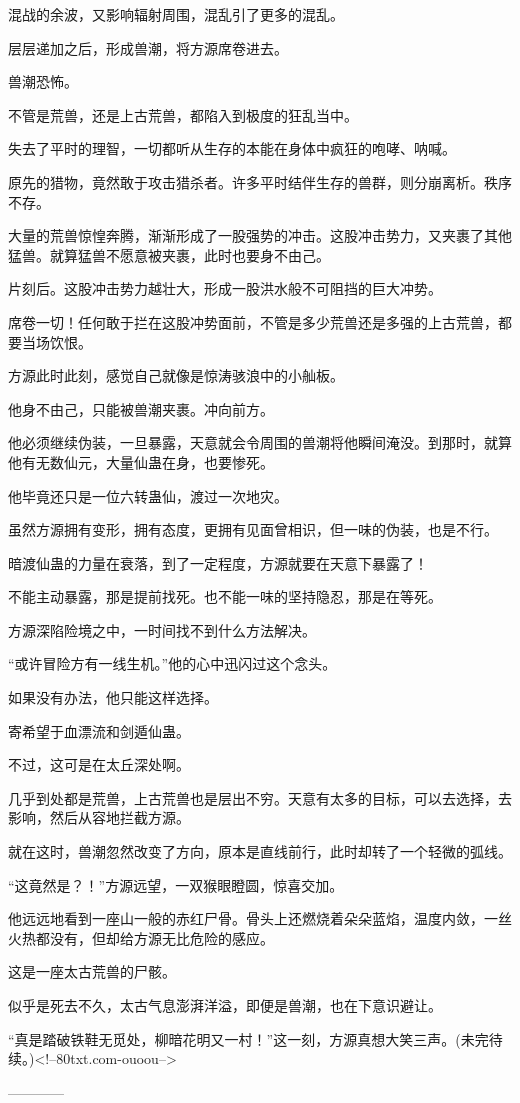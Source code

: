 \begin{this_body}
混战的余波，又影响辐射周围，混乱引了更多的混乱。

层层递加之后，形成兽潮，将方源席卷进去。

兽潮恐怖。

不管是荒兽，还是上古荒兽，都陷入到极度的狂乱当中。

失去了平时的理智，一切都听从生存的本能在身体中疯狂的咆哮、呐喊。

原先的猎物，竟然敢于攻击猎杀者。许多平时结伴生存的兽群，则分崩离析。秩序不存。

大量的荒兽惊惶奔腾，渐渐形成了一股强势的冲击。这股冲击势力，又夹裹了其他猛兽。就算猛兽不愿意被夹裹，此时也要身不由己。

片刻后。这股冲击势力越壮大，形成一股洪水般不可阻挡的巨大冲势。

席卷一切！任何敢于拦在这股冲势面前，不管是多少荒兽还是多强的上古荒兽，都要当场饮恨。

方源此时此刻，感觉自己就像是惊涛骇浪中的小舢板。

他身不由己，只能被兽潮夹裹。冲向前方。

他必须继续伪装，一旦暴露，天意就会令周围的兽潮将他瞬间淹没。到那时，就算他有无数仙元，大量仙蛊在身，也要惨死。

他毕竟还只是一位六转蛊仙，渡过一次地灾。

虽然方源拥有变形，拥有态度，更拥有见面曾相识，但一味的伪装，也是不行。

暗渡仙蛊的力量在衰落，到了一定程度，方源就要在天意下暴露了！

不能主动暴露，那是提前找死。也不能一味的坚持隐忍，那是在等死。

方源深陷险境之中，一时间找不到什么方法解决。

“或许冒险方有一线生机。”他的心中迅闪过这个念头。

如果没有办法，他只能这样选择。

寄希望于血漂流和剑遁仙蛊。

不过，这可是在太丘深处啊。

几乎到处都是荒兽，上古荒兽也是层出不穷。天意有太多的目标，可以去选择，去影响，然后从容地拦截方源。

就在这时，兽潮忽然改变了方向，原本是直线前行，此时却转了一个轻微的弧线。

“这竟然是？！”方源远望，一双猴眼瞪圆，惊喜交加。

他远远地看到一座山一般的赤红尸骨。骨头上还燃烧着朵朵蓝焰，温度内敛，一丝火热都没有，但却给方源无比危险的感应。

这是一座太古荒兽的尸骸。

似乎是死去不久，太古气息澎湃洋溢，即便是兽潮，也在下意识避让。

“真是踏破铁鞋无觅处，柳暗花明又一村！”这一刻，方源真想大笑三声。(未完待续。)<!--80txt.com-ouoou-->

------------

\end{this_body}

